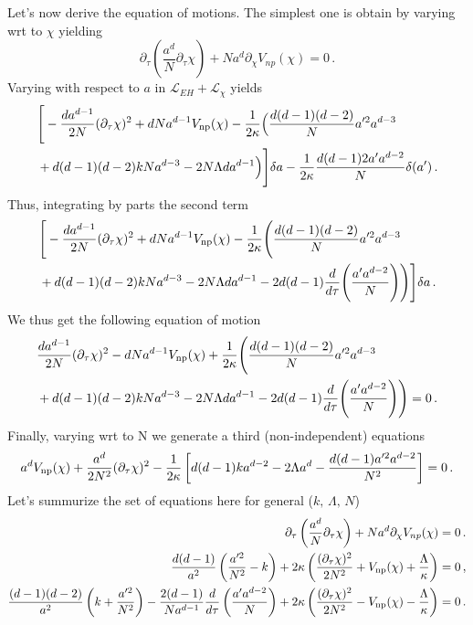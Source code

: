 \documentclass[a4paper]{article}
\begin{document}
Let's now derive the equation of motions. The simplest one is obtain by varying wrt to $\chi$ yielding
\begin{equation}
  \partial_\tau\left(\frac{a^d}{N}\partial_\tau \chi\right)+Na^{d}\partial_{\chi}V_{np}(\chi)=0\,.
\end{equation}
Varying with respect to $a$ in $\mathcal{L}_{EH}+\mathcal{L}_{\chi}$ yields
\begin{equation}
  \begin{aligned}
    &\Bigg[-\frac{d a^{d-1}}{2N}(\partial_\tau \chi)^2+d N a^{d-1} V_{\rm np}(\chi)-\frac{1}{2\kappa}\Big(\frac{d(d-1)(d-2)}{N}a'^2a^{d-3}\\
    &+d(d-1)(d-2)kNa^{d-3}-2N \Lambda d a^{d-1} \Big)\Bigg]\delta a
    -\frac{1}{2\kappa}\frac{d(d-1)2a'a^{d-2}}{N}\delta(a')\,.
  \end{aligned}
\end{equation}
Thus, integrating by parts the second term
\begin{equation}
  \begin{aligned}
    &\Bigg[-\frac{d a^{d-1}}{2N}(\partial_\tau \chi)^2+d N a^{d-1} V_{\rm np}(\chi)-\frac{1}{2\kappa}\Bigg(\frac{d(d-1)(d-2)}{N}a'^2a^{d-3}\\
    &+d(d-1)(d-2)kNa^{d-3}-2N \Lambda d a^{d-1} -2d(d-1)\frac{d}{d\tau}\Bigg(\frac{a' a^{d-2}}{N}\Bigg)\Bigg)\Bigg]\delta a\,.
  \end{aligned}
\end{equation}
We thus get the following equation of motion
\begin{equation}
  \begin{aligned}
    &\frac{d a^{d-1}}{2N}(\partial_\tau \chi)^2-d N a^{d-1} V_{\rm np}(\chi)+\frac{1}{2\kappa}\Bigg(\frac{d(d-1)(d-2)}{N}a'^2a^{d-3}\\
    &+d(d-1)(d-2)kNa^{d-3}-2N \Lambda d a^{d-1} -2d(d-1)\frac{d}{d\tau}\Bigg(\frac{a' a^{d-2}}{N}\Bigg)\Bigg)=0\,.
  \end{aligned}
\end{equation}
Finally, varying wrt to N we generate a third (non-independent) equations
\begin{equation}
  \begin{aligned}
    a^d V_{\rm np}(\chi)+\frac{a^d}{2N^2}(\partial_\tau \chi)^2-\frac{1}{2\kappa}\left[d(d-1)ka^{d-2}-2\Lambda a^d -\frac{d(d-1)a'^2 a^{d-2}}{N^2}\right]=0\,.
  \end{aligned}
\end{equation}
Let's summurize the set of equations here for general ($k,\,\Lambda,\,N$)
\begin{equation}
  \begin{aligned}
    \partial_\tau\left(\frac{a^d}{N}\partial_\tau \chi\right)+Na^{d}\partial_{\chi}V_{np}(\chi)&=0\,.\\
    \frac{d(d-1)}{a^2}\left(\frac{a'^2}{N^2}-k\right)+2\kappa\left(\frac{(\partial_\tau \chi)^2}{2N^2}+V_{\rm np}(\chi)+\frac{\Lambda}{\kappa}\right)&=0\,,\\
    \frac{(d-1)(d-2)}{a^2}\left(k+\frac{a'^2}{N^2}\right)-\frac{2(d-1)}{Na^{d-1}}\frac{d}{d\tau}\left(\frac{a' a^{d-2}}{N}\right)+2\kappa \left(\frac{(\partial_\tau \chi)^2}{2N^2}-V_{\rm np}(\chi)-\frac{\Lambda}{\kappa}\right)&=0\,.
  \end{aligned}
\end{equation}
\end{document}
